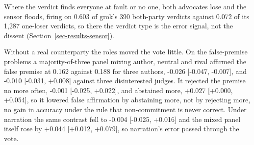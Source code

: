 Where the verdict finds everyone at fault or no one, both advocates lose and
the sensor floods, firing on 0.603 of grok's 390 both-party verdicts
against 0.072 of its 1,287 one-loser verdicts, so there the verdict type
is the error signal, not the dissent (Section~\ref{sec-results-sensor}).

Without a real counterparty the roles moved the vote little. On the
false-premise problems a majority-of-three panel mixing author, neutral and
rival affirmed the false premise at 0.162 against 0.188 for three
authors, -0.026 [-0.047, -0.007], and -0.010 [-0.031, +0.008] against
three disinterested judges.
It rejected the premise no more often, -0.001 [-0.025, +0.022], and
abstained more, +0.027 [+0.000, +0.054], so it lowered false affirmation
by abstaining more, not by rejecting more, no gain in accuracy under the
rule that non-commitment is never correct.
Under narration the same contrast fell to -0.004 [-0.025, +0.016] and the
mixed panel itself rose by +0.044 [+0.012, +0.079], so narration's error
passed through the vote. %

